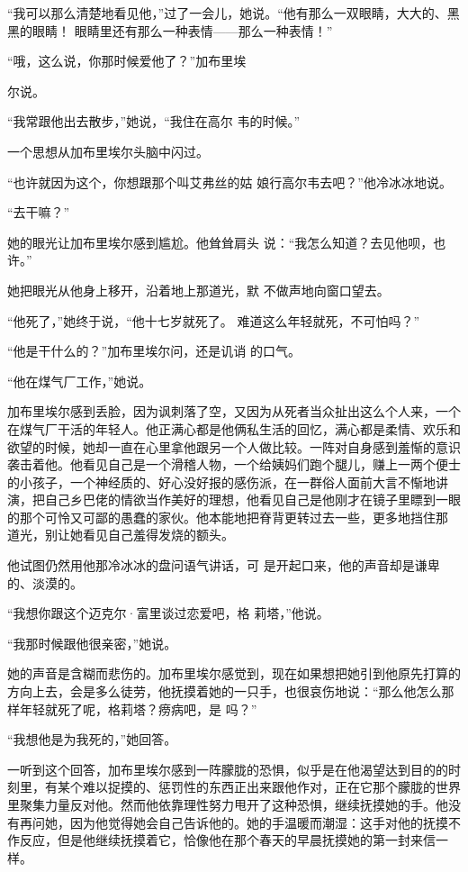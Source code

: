 \documentclass{article}
\begin{document}
“我可以那么清楚地看见他，”过了一会儿，她说。“他有那么一双眼睛，大大的、黑黑的眼睛！
眼睛里还有那么一种表情——那么一种表情！” 

“哦，这么说，你那时候爱他了？”加布里埃
\newpage

尔说。 

“我常跟他出去散步，”她说，“我住在高尔
韦的时候。” 


一个思想从加布里埃尔头脑中闪过。 

“也许就因为这个，你想跟那个叫艾弗丝的姑
娘行高尔韦去吧？”他冷冰冰地说。 


“去干嘛？” 

她的眼光让加布里埃尔感到尴尬。他耸耸肩头
说：“我怎么知道？去见他呗，也许。” 

她把眼光从他身上移开，沿着地上那道光，默
不做声地向窗口望去。 

“他死了，”她终于说，“他十七岁就死了。
难道这么年轻就死，不可怕吗？” 

\newpage

“他是干什么的？”加布里埃尔问，还是讥诮
的口气。 


“他在煤气厂工作，”她说。 

加布里埃尔感到丢脸，因为讽刺落了空，又因为从死者当众扯出这么个人来，一个在煤气厂干活的年轻人。他正满心都是他俩私生活的回忆，满心都是柔情、欢乐和欲望的时候，她却一直在心里拿他跟另一个人做比较。一阵对自身感到羞惭的意识袭击着他。他看见自己是一个滑稽人物，一个给姨妈们跑个腿儿，赚上一两个便士的小孩子，一个神经质的、好心没好报的感伤派，在一群俗人面前大言不惭地讲演，把自己乡巴佬的情欲当作美好的理想，他看见自己是他刚才在镜子里瞟到一眼的那个可怜又可鄙的愚蠢的家伙。他本能地把脊背更转过去一些，更多地挡住那
道光，别让她看见自己羞得发烧的额头。 

他试图仍然用他那冷冰冰的盘问语气讲话，可
是开起口来，他的声音却是谦卑的、淡漠的。 

\newpage

“我想你跟这个迈克尔·富里谈过恋爱吧，格
莉塔，”他说。 


“我那时候跟他很亲密，”她说。 

她的声音是含糊而悲伤的。加布里埃尔感觉到，现在如果想把她引到他原先打算的方向上去，会是多么徒劳，他抚摸着她的一只手，也很哀伤地说：“那么他怎么那样年轻就死了呢，格莉塔？痨病吧，是
吗？” 


“我想他是为我死的，”她回答。 

一听到这个回答，加布里埃尔感到一阵朦胧的恐惧，似乎是在他渴望达到目的的时刻里，有某个难以捉摸的、惩罚性的东西正出来跟他作对，正在它那个朦胧的世界里聚集力量反对他。然而他依靠理性努力甩开了这种恐惧，继续抚摸她的手。他没有再问她，因为他觉得她会自己告诉他的。她的手温暖而潮湿：这手对他的抚摸不作反应，但是他继续抚摸着它，恰像他在那个春天的早晨抚摸她的第一封来信一样。
\newpage
\end{document}
